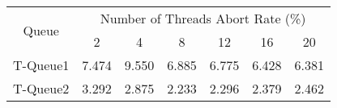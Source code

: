 \begin{tabular}{|c|c|c|c|c|c|c|}
\hline
\multirow{2}{*}{Queue} & \multicolumn{6}{c|}{Number of Threads Abort Rate (\%)}\\\cline{2-7}& 2 & 4 & 8 & 12 & 16 & 20\\
\hline
\hline
T-Queue1 & 7.474 & 9.550 & 6.885 & 6.775 & 6.428 & 6.381\\
T-Queue2 & 3.292 & 2.875 & 2.233 & 2.296 & 2.379 & 2.462\\
\hline\end{tabular}
